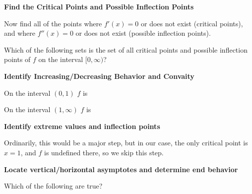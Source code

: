 \documentclass{ximera}
\begin{document}
\begin{question}
 \textbf{Find the Critical Points and Possible Inflection Points}
 
 \begin{solution}
	Now find all of the points where $f'(x)=0$ or does not exist (critical points), and where $f''(x)=0$ or does not exist (possible inflection points).
	
	Which of the following sets is the set of all critical points and possible inflection points of $f$ on the interval $[0,\infty)$?
	
	 \begin{multipleChoice}
    \end{multipleChoice}

 \end{solution}
 
 \textbf{Identify Increasing/Decreasing Behavior and Convaity}
 
 On the interval $(0,1)$ $f$ is
 
  \begin{multipleChoice}
    \end{multipleChoice}
    
  On the interval $(1,\infty)$ $f$ is
 
  \begin{multipleChoice}
    \end{multipleChoice}
    
 \textbf{Identify extreme values and inflection points}
 
 Ordinarily, this would be a major step, but in our case, the only critical point is $x=1$, and $f$ is undefined there, so we skip this step.
 
 \textbf{Locate vertical/horizontal asymptotes and determine end behavior}
 
 Which of the following are true?
 
 \begin{multipleChoice}
    \end{multipleChoice}
    

\end{question}
\end{document}
